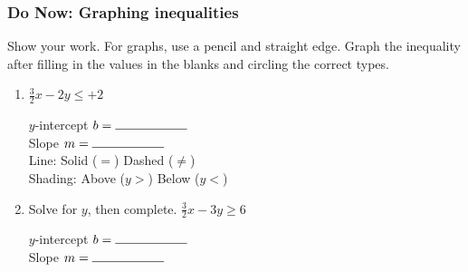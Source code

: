 \documentclass[12pt, twoside]{article}
\begin{document}
\begin{enumerate}
\newpage
\subsubsection*{Do Now: Graphing inequalities}
Show your work. For graphs, {\large use a pencil and straight edge}. Graph the inequality after filling in the values in the blanks and circling the correct types.
  \begin{enumerate}

    \item $\displaystyle \frac{3}{2} x - 2y \leq  +2 $

        \vspace{0.25cm}
        \begin{multicols}{2}
          $y$-intercept $b= \rule{2cm}{0.15mm}$ \\[0.5cm]
          Slope \hspace{0.7cm} $m= \rule{2cm}{0.15mm}$\\[0.5cm]

          Line: \hspace{1cm} Solid ($=$) \hspace{0.45cm} Dashed ($\neq$)\\[0.5cm]
          Shading: \hspace{0.3cm} Above ($y>$) \hspace{0.25cm} Below ($y<$)\\
        \end{multicols}

    \begin{center} %
    \end{center}

    \item Solve for $y$, then complete. $\displaystyle \frac{3}{2} x - 3y \geq 6 $

        \vspace{3cm}
        \begin{multicols}{2}
          \raggedcolumns
          $y$-intercept $b= \rule{2cm}{0.15mm}$ \\[0.5cm]
          Slope \hspace{0.7cm} $m= \rule{2cm}{0.15mm}$\\


\end{multicols}
\end{enumerate}
\end{enumerate}
\end{document}
